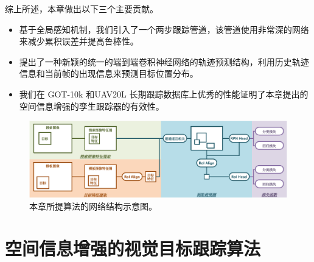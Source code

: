 综上所述，本章做出以下三个主要贡献。
\begin{itemize}
\item 基于全局感知机制，我们引入了一个两步跟踪管道，该管道使用非常深的网络来减少累积误差并提高鲁棒性。
\item 提出了一种新颖的统一的端到端卷积神经网络的轨迹预测结构，利用历史轨迹信息和当前帧的出现信息来预测目标位置分布。
\item 我们在 GOT-10k \cite{GOT-10k} 和UAV20L \cite{mueller2016benchmark} 长期跟踪数据库上优秀的性能证明了本章提出的空间信息增强的孪生跟踪器的有效性。
\end{itemize}

\begin{figure}[t]
    \centering
    \includegraphics[width=1.0\textwidth]{Img/globally/SiamRCNN.pdf}
    \caption{本章所提算法的网络结构示意图。}
    \label{fig:siamrcnn}
\end{figure}

\section{空间信息增强的视觉目标跟踪算法}

